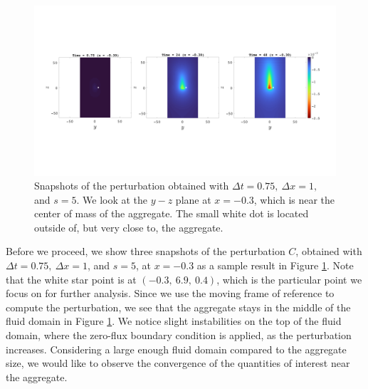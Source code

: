 \begin{figure}[ht]
	\begin{center}
		\includegraphics[scale=0.235]{./figures/fig_NC10_snaps_all.pdf}
		\caption{Snapshots of the perturbation obtained with $\Delta t = 0.75, \ \Delta x = 1,$ and $s = 5$. We look at the $y-z$ plane at $x = -0.3$, which is near the center of mass of the aggregate. The small white dot is located outside of, but very close to, the aggregate.}
		\label{fig_NC10_snaps_all}
	\end{center}
\end{figure}
Before we proceed, we show three snapshots of the perturbation $C$, obtained with $\Delta t = 0.75, \ \Delta x = 1$, and $s = 5$, at $x = -0.3$ as a sample result in Figure \ref{fig_NC10_snaps_all}. Note that the white star point is at $(-0.3, \    6.9, \      0.4)$, which is the particular point we focus on for further analysis. Since we use the moving frame of reference to compute the perturbation, we see that the aggregate stays in the middle of the fluid domain in Figure \ref{fig_NC10_snaps_all}.
We notice slight instabilities on the top of the fluid domain, where the zero-flux boundary condition is applied, as the perturbation increases. Considering a large enough fluid domain compared to the aggregate size, we would like to observe the convergence of the quantities of interest near the aggregate. 
